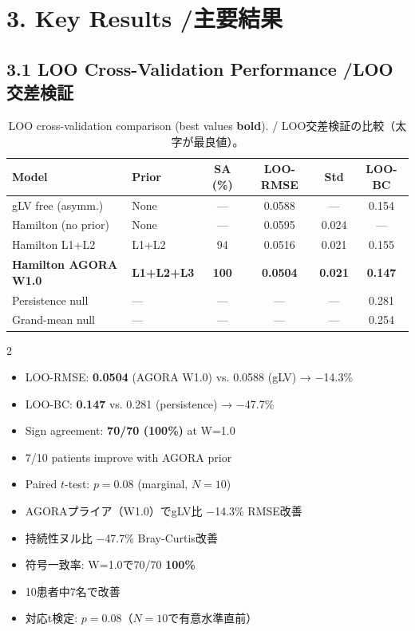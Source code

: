 \documentclass[10pt,a4paper]{article}
\begin{document}
\section{3. Key Results \quad /\quad 主要結果}

\subsection{3.1 LOO Cross-Validation Performance \quad /\quad LOO交差検証}

\begin{table}[h]
\centering
\small
\caption{LOO cross-validation comparison (best values \textbf{bold}). /
LOO交差検証の比較（太字が最良値）。}
\begin{tabular}{llcccc}
\toprule
Model & Prior & SA (\%) & LOO-RMSE & Std & LOO-BC \\
\midrule
gLV free (asymm.)        & None     & ---     & 0.0588 & ---   & 0.154 \\
Hamilton (no prior)      & None     & ---     & 0.0595 & 0.024 & ---   \\
Hamilton L1+L2           & L1+L2    & 94      & 0.0516 & 0.021 & 0.155 \\
\textbf{Hamilton AGORA W1.0} & \textbf{L1+L2+L3} & \textbf{100} & \textbf{0.0504} & \textbf{0.021} & \textbf{0.147} \\
Persistence null         & ---      & ---     & ---    & ---   & 0.281 \\
Grand-mean null          & ---      & ---     & ---    & ---   & 0.254 \\
\bottomrule
\end{tabular}
\end{table}

\begin{keybox}
\begin{multicols}{2}
\small
\begin{itemize}[noitemsep]
  \item LOO-RMSE: \textbf{0.0504} (AGORA W1.0) vs. 0.0588 (gLV) → $-$14.3\%
  \item LOO-BC: \textbf{0.147} vs. 0.281 (persistence) → $-$47.7\%
  \item Sign agreement: \textbf{70/70 (100\%)} at W=1.0
  \item 7/10 patients improve with AGORA prior
  \item Paired $t$-test: $p=0.08$ (marginal, $N=10$)
\end{itemize}
\columnbreak
\begin{itemize}[noitemsep]
  \item AGORAプライア（W1.0）でgLV比 $-$14.3\% RMSE改善
  \item 持続性ヌル比 $-$47.7\% Bray-Curtis改善
  \item 符号一致率: W=1.0で70/70 \textbf{100\%}
  \item 10患者中7名で改善
  \item 対応t検定: $p=0.08$（$N=10$で有意水準直前）
\end{itemize}
\end{multicols}
\end{keybox}
\end{document}
